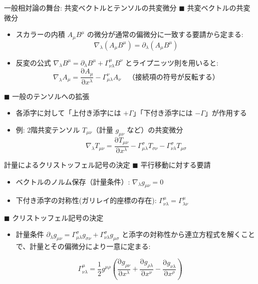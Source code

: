 \documentclass[unicode, aspectratio=169, 12pt]{beamer}
\newcommand{\pdiff}[2]{\frac{\mathrm{\partial} #1}{\mathrm{\partial} #2}} %
\begin{document}
\begin{frame}{一般相対論の舞台: 共変ベクトルとテンソルの共変微分}
    $\blacksquare$ 共変ベクトルの共変微分
    \begin{itemize}
        \item スカラーの内積 $A_\mu B^\mu$ の微分が通常の偏微分に一致する要請から定まる:
        \begin{equation*}
            \nabla_\lambda(A_\mu B^\mu) = \partial_\lambda(A_\mu B^\mu)
        \end{equation*}
        \item 反変の公式 $\nabla_\lambda B^\mu = \partial_\lambda B^\mu + \Gamma^\mu_{\nu\lambda} B^\nu$ とライプニッツ則を用いると:
        \begin{equation*}
            \nabla_\lambda A_\mu = \pdiff{A_\mu}{x^\lambda} - \Gamma^\nu_{\mu\lambda} A_\nu \quad \text{（接続項の符号が反転する）}
        \end{equation*}
    \end{itemize}

    \vspace{0.4em}
    $\blacksquare$ 一般のテンソルへの拡張
    \begin{itemize}
        \item 各添字に対して「上付き添字には $+\Gamma$」「下付き添字には $-\Gamma$」が作用する
        \item 例: 2階共変テンソル $T_{\mu\nu}$（計量 $g_{\mu\nu}$ など）の共変微分
        \begin{equation*}
            \nabla_\lambda T_{\mu\nu} = \pdiff{T_{\mu\nu}}{x^\lambda} - \Gamma^\sigma_{\mu\lambda} T_{\sigma\nu} - \Gamma^\sigma_{\nu\lambda} T_{\mu\sigma}
        \end{equation*}
    \end{itemize}
\end{frame}

\begin{frame}{計量によるクリストッフェル記号の決定}
    $\blacksquare$ 平行移動に対する要請
    \begin{itemize}
        \item ベクトルのノルム保存（計量条件）: $\nabla_\lambda g_{\mu\nu} = 0$
        \item 下付き添字の対称性(ガリレイ的座標の存在): $\Gamma^\mu_{\nu\lambda} = \Gamma^\mu_{\lambda\nu}$
    \end{itemize}

    \vspace{0.8em}
    $\blacksquare$ クリストッフェル記号の決定
    \begin{itemize}
        \item 計量条件 $\partial_\lambda g_{\mu\nu} = \Gamma^\sigma_{\mu\lambda} g_{\sigma\nu} + \Gamma^\sigma_{\nu\lambda} g_{\mu\sigma}$ と添字の対称性から連立方程式を解くことで、計量とその偏微分により一意に定まる:
    \end{itemize}

    \begin{equation*}
        \Gamma^\mu_{\nu\lambda} = \frac{1}{2} g^{\mu\rho} \left( \pdiff{g_{\rho\nu}}{x^\lambda} + \pdiff{g_{\rho\lambda}}{x^\nu} - \pdiff{g_{\nu\lambda}}{x^\rho} \right)
    \end{equation*}
\end{frame}
\end{document}
